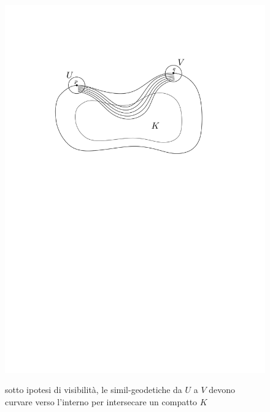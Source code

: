 \begin{figure}[h!]
    \begin{center}
        \includegraphics[width=1.10\textwidth, trim=0 18cm 0 5cm]{Immagini/vis2.png} \\
        \caption{sotto ipotesi di visibilità, le simil-geodetiche da $U$ a $V$ devono curvare verso l'interno per intersecare un compatto $K$}
    \end{center}
\end{figure}

